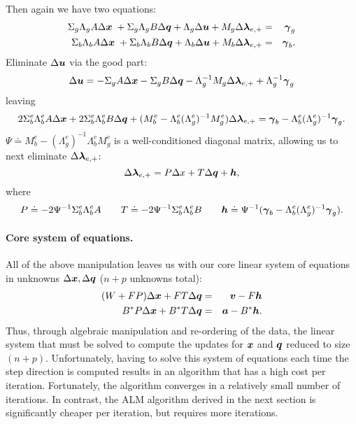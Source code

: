 Then again we have two equations:
\begin{eqnarray}
\Sigma_g \Lambda_g A \Delta {\boldsymbol{x}} \; + \Sigma_g \Lambda_g B \Delta {\boldsymbol q} + \Lambda_g \Delta \boldsymbol{u} + M_g \Delta \boldsymbol{\lambda}_{e,+} &=& \boldsymbol{\gamma}_g \\
\Sigma_b \Lambda_b A \Delta {\boldsymbol{x}} \; +  \Sigma_b \Lambda_b B \Delta {\boldsymbol q} + \Lambda_b \Delta \boldsymbol{u} + M_b \Delta \boldsymbol{\lambda}_{e,+} &=& \boldsymbol{\gamma}_b. \label{eqn:bot-bad}
\end{eqnarray}
Eliminate $\Delta \boldsymbol{u}$ via the good part:
\begin{equation}
\Delta \boldsymbol{u} = - \Sigma_g A \Delta {\boldsymbol{x}} - \Sigma_g B \Delta {\boldsymbol q} - \Lambda_g^{-1} M_g \Delta \boldsymbol{\lambda}_{e,+} + \Lambda_g^{-1} \boldsymbol{\gamma}_g
\end{equation}
leaving 
\begin{equation}
2 \Sigma^e_b \Lambda^e_b A \Delta {\boldsymbol{x}} + 2 \Sigma^e_b \Lambda^e_b B \Delta {\boldsymbol q} + (M^e_b - \Lambda^e_b (\Lambda^e_g)^{-1} M^e_g) \Delta \boldsymbol{\lambda}_{e,+} = \boldsymbol{\gamma}_b - \Lambda^e_b (\Lambda^e_g)^{-1} \boldsymbol{\gamma}_g.
\end{equation}
$\Psi \doteq M_b^e - (\Lambda^e_g)^{-1} \Lambda^e_b M^e_g$ is a well-conditioned diagonal matrix, allowing us to next eliminate $\Delta \boldsymbol{\lambda}_{e,+}$:
\begin{equation}
\Delta \boldsymbol{\lambda}_{e,+} = P\Delta x + T \Delta {\boldsymbol q} + \boldsymbol{h},
\end{equation}
where 
\begin{equation}
P \doteq - 2 \Psi^{-1} \Sigma^e_b \Lambda^e_b A \qquad T \doteq -2 \Psi^{-1}\Sigma^e_b \Lambda^e_b B \qquad \boldsymbol{h} \doteq \Psi^{-1}( \boldsymbol{\gamma}_b - \Lambda^e_b (\Lambda^e_g)^{-1} \boldsymbol{\gamma}_g ).
\end{equation}

\paragraph{Core system of equations.} All of the above manipulation leaves us
with our core linear system of equations in unknowns $\Delta {\boldsymbol{x}}, \Delta {\boldsymbol q}$ ($n
+ p$ unknowns total): \begin{eqnarray} (W+FP) \Delta {\boldsymbol{x}} + F T \Delta {\boldsymbol q} &=& \boldsymbol{v}
- F \boldsymbol{h} \\ B^* P \Delta {\boldsymbol{x}} + B^* T \Delta {\boldsymbol q} &=& \boldsymbol{a} - B^* \boldsymbol{h} .  \end{eqnarray}
Thus, through algebraic manipulation and re-ordering of the data, the linear
system that must be solved to compute the updates for ${\boldsymbol{x}}$ and ${\boldsymbol q}$ reduced to
size $(n+p)$.  Unfortunately, having to solve this system of equations each
time the step direction is computed results in an algorithm that has a high
cost per iteration.  Fortunately, the algorithm converges in a relatively 
small number of iterations.  In contrast, the ALM algorithm derived in the next
section is significantly cheaper per iteration, but requires more iterations.

